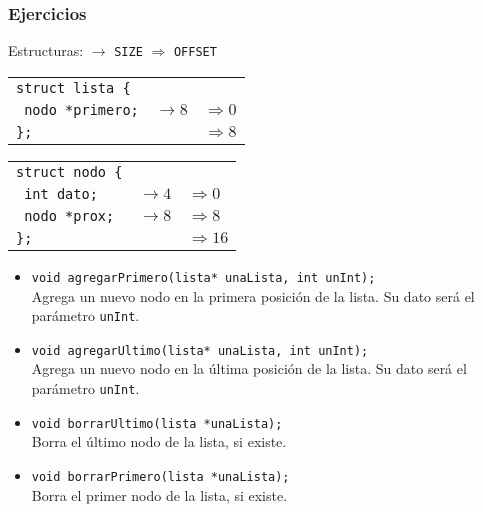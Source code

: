\documentclass[aspectratio=169]{beamer}
\begin{document}
\begin{frame}[t]
    \frametitle{Ejercicios}
    \small
    Estructuras: \textcolor{verdeuca}{$\rightarrow$ \texttt{SIZE} $\Rightarrow$ \texttt{OFFSET}}
    \begin{multicols}{2}
    \begin{tabular}{lll}
    \texttt{struct lista \{}       &                                       & \\
    \texttt{      nodo *primero;}  & \textcolor{verdeuca}{$\rightarrow 8$} & \textcolor{verdeuca}{$\Rightarrow 0$}\\
    \texttt{\};}                   &                                       & \textcolor{verdeuca}{$\Rightarrow 8$}\\
    \end{tabular}
    \columnbreak
    \begin{tabular}{lll}
    \texttt{struct nodo \{}     &                                       & \\
    \texttt{      int dato;}    & \textcolor{verdeuca}{$\rightarrow 4$} & \textcolor{verdeuca}{$\Rightarrow 0$}\\
    \texttt{      nodo *prox;}  & \textcolor{verdeuca}{$\rightarrow 8$} & \textcolor{verdeuca}{$\Rightarrow 8$}\\
    \texttt{\};}                &                                       & \textcolor{verdeuca}{$\Rightarrow 16$}\\
    \end{tabular}
    \end{multicols}
    \begin{itemize}
    \item \texttt{void agregarPrimero(lista* unaLista, int unInt);}\\
        Agrega un nuevo nodo en la primera posición de la lista. Su dato será el parámetro \texttt{unInt}.
        \vspace{0.1cm}
    \item \texttt{void agregarUltimo(lista* unaLista, int unInt);}\\
        Agrega un nuevo nodo en la última posición de la lista. Su dato será el parámetro \texttt{unInt}.
        \vspace{0.1cm}
    \item \texttt{void borrarUltimo(lista *unaLista);}\\
        Borra el último nodo de la lista, si existe.
        \vspace{0.1cm}
    \item \texttt{void borrarPrimero(lista *unaLista);}\\
        Borra el primer nodo de la lista, si existe.
    \end{itemize}
\end{frame}
\end{document}
